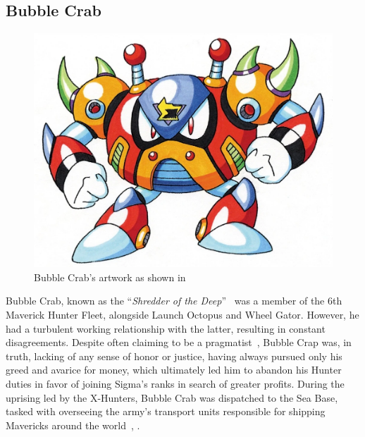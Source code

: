 \subsection{Bubble Crab}\label{boss:Bubble_crab}
\begin{figure}[htp]
	\centering
	\includegraphics[height=\portraitsize]{figures/X2/Bubble_crab/Bubble_Crab.png}
	\caption{Bubble Crab's artwork as shown in \cite{book:MMX_Complete_art}}
\end{figure}
Bubble Crab, known as the ``\textit{Shredder of the Deep}''~\cite{book:MMX_Complete_art} was a member of the 6th Maverick Hunter Fleet, alongside Launch Octopus and Wheel Gator. However, he had a turbulent working relationship with the latter, resulting in constant disagreements. Despite often claiming to be a pragmatist~\cite{Xcoll1:Manual_X2}, Bubble Crap was, in truth, lacking of any sense of honor or justice, having always pursued only his greed and avarice for money, which ultimately led him to abandon his Hunter duties in favor of joining Sigma's ranks in search of greater profits. During the uprising led by the X-Hunters, Bubble Crab was dispatched to the Sea Base, tasked with overseeing the army's transport units responsible for shipping Mavericks around the world~\cite{wiki:Bubble_Crab}, \cite{wayback:X2_resources}.

